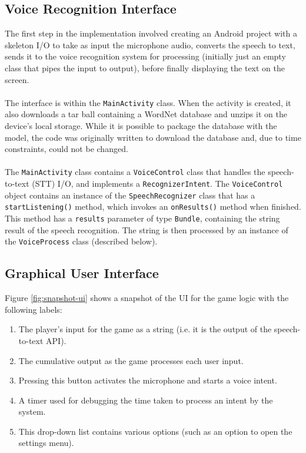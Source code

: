 \documentclass[11pt]{article}
\begin{document}
\subsection{Voice Recognition Interface}

The first step in the implementation involved creating an Android project with a skeleton I/O to take as input the microphone audio, converts the speech to text, sends it to the voice recognition system for processing (initially just an empty class that pipes the input to output), before finally displaying the text on the screen.
\\
\\
The interface is within the \texttt{MainActivity} class. When the activity is created, it also downloads a tar ball containing a WordNet database and unzips it on the device's local storage. While it is possible to package the database with the model, the code was originally written to download the database and, due to time constraints, could not be changed.
\\
\\
The \texttt{MainActivity} class contains a \texttt{VoiceControl} class that  handles the speech-to-text (STT) I/O, and implements a \texttt{RecognizerIntent}. The \texttt{VoiceControl} object contains an instance of the \texttt{SpeechRecognizer} class that has a \texttt{startListening()} method, which invokes an \texttt{onResults()} method when finished. This method has a \texttt{results} parameter of type \texttt{Bundle}, containing the string result of the speech recognition. The string is then processed by an instance of the \texttt{VoiceProcess} class (described below).

\subsection{Graphical User Interface}

Figure \ref{fig:snapshot-ui} shows a snapshot of the UI for the game logic with the following labels:

\begin{enumerate}
	\item The player's input for the game as a string (i.e. it is the output of the speech-to-text API).
	\item The cumulative output as the game processes each user input.
	\item Pressing this button activates the microphone and starts a voice intent.
	\item A timer used for debugging the time taken to process an intent by the system.
	\item This drop-down list contains various options (such as an option to open the settings menu).
\end{enumerate}
\end{document}
